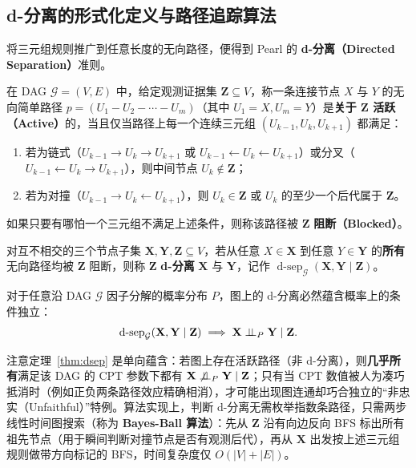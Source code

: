 \subsection{d-分离的形式化定义与路径追踪算法}

将三元组规则推广到任意长度的无向路径，便得到 Pearl 的 \textbf{d-分离（Directed Separation）}准则。

\begin{defBox}
\begin{definition}\label{def:dsep}
在 DAG $\mathcal{G} = (V, E)$ 中，给定观测证据集 $\mathbf{Z} \subseteq V$，称一条连接节点 $X$ 与 $Y$ 的无向简单路径 $p = (U_1 - U_2 - \cdots - U_m)$（其中 $U_1=X, U_m=Y$）是\textbf{关于 $\mathbf{Z}$ 活跃（Active）}的，当且仅当路径上每一个连续三元组 $(U_{k-1}, U_k, U_{k+1})$ 都满足：
\begin{enumerate}
  \item 若为链式（$U_{k-1}\to U_k\to U_{k+1}$ 或 $U_{k-1}\leftarrow U_k\leftarrow U_{k+1}$）或分叉（$U_{k-1}\leftarrow U_k\to U_{k+1}$），则中间节点 $U_k \notin \mathbf{Z}$；
  \item 若为对撞（$U_{k-1}\to U_k\leftarrow U_{k+1}$），则 $U_k \in \mathbf{Z}$ 或 $U_k$ 的至少一个后代属于 $\mathbf{Z}$。
\end{enumerate}
如果只要有哪怕一个三元组不满足上述条件，则称该路径被 $\mathbf{Z}$ \textbf{阻断（Blocked）}。

对互不相交的三个节点子集 $\mathbf{X}, \mathbf{Y}, \mathbf{Z} \subseteq V$，若从任意 $X \in \mathbf{X}$ 到任意 $Y \in \mathbf{Y}$ 的\textbf{所有}无向路径均被 $\mathbf{Z}$ 阻断，则称 $\mathbf{Z}$ \textbf{d-分离} $\mathbf{X}$ 与 $\mathbf{Y}$，记作 $\operatorname{d-sep}_{\mathcal{G}}(\mathbf{X}, \mathbf{Y} \mid \mathbf{Z})$。
\end{definition}
\end{defBox}

\begin{thmBox}
\begin{theorem}\label{thm:dsep}
对于任意沿 DAG $\mathcal{G}$ 因子分解的概率分布 $P$，图上的 d-分离必然蕴含概率上的条件独立：
\[
  \operatorname{d-sep}_{\mathcal{G}}(\mathbf{X}, \mathbf{Y} \mid \mathbf{Z}) \implies \mathbf{X} \perp\!\!\!\perp_P \mathbf{Y} \mid \mathbf{Z}.
\]
\end{theorem}
\end{thmBox}

\begin{remark}[逆命题与忠实性]
注意定理~\ref{thm:dsep} 是单向蕴含：若图上存在活跃路径（非 d-分离），则\textbf{几乎所有}满足该 DAG 的 CPT 参数下都有 $\mathbf{X} \not\perp\!\!\!\perp_P \mathbf{Y} \mid \mathbf{Z}$；只有当 CPT 数值被人为凑巧抵消时（例如正负两条路径效应精确相消），才可能出现图连通却巧合独立的“非忠实（Unfaithful）”特例。算法实现上，判断 d-分离无需枚举指数条路径，只需两步线性时间图搜索（称为 \textbf{Bayes-Ball 算法}）：先从 $\mathbf{Z}$ 沿有向边反向 BFS 标出所有祖先节点（用于瞬间判断对撞节点是否有观测后代），再从 $\mathbf{X}$ 出发按上述三元组规则做带方向标记的 BFS，时间复杂度仅 $O(|V| + |E|)$。
\end{remark}

